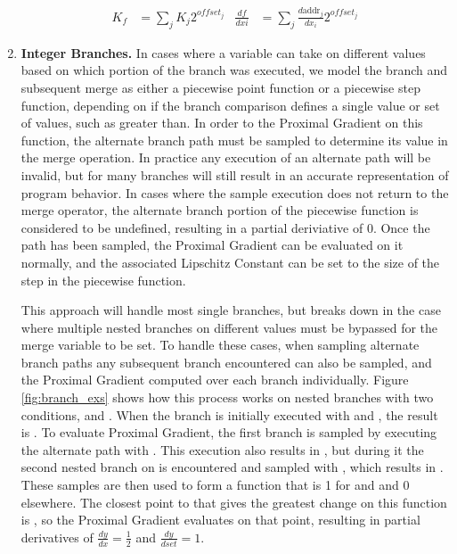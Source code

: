 \begin{enumerate}
\vspace{-10pt}\begin{align*}
  K_f &= \sum_j K_j 2^{offset_j} &
  \frac{df}{dxi} &= \sum_j \frac{d \textrm{addr}_j}{dx_i}2^{offset_j}
\end{align*}


\item \textbf{Integer Branches.} In cases where a variable can take on different values based on which portion of the branch was executed, we model the branch and subsequent merge as either a piecewise point function or a piecewise step function, depending on if the branch comparison defines a single value or set of values, such as greater than. In order to the Proximal Gradient on this function, the alternate branch path must be sampled to determine its value in the merge operation. In practice any execution of an alternate path will be invalid, but for many branches will still result in an accurate representation of program behavior. In cases where the sample execution does not return to the merge operator, the alternate branch portion of the piecewise function is considered to be undefined, resulting in a partial deriviative of 0. Once the path has been sampled, the Proximal Gradient can be evaluated on it normally, and the associated Lipschitz Constant can be set to the size of the step in the piecewise function.

  This approach will handle most single branches, but breaks down in the case where multiple nested branches on different values must be bypassed for the merge variable to be set. To handle these cases, when sampling alternate branch paths any subsequent branch encountered can also be sampled, and the Proximal Gradient computed over each branch individually. Figure \ref{fig:branch_exs} shows how this process works on nested branches with two conditions,  and . When the branch is initially executed with  and , the result is . To evaluate Proximal Gradient, the first branch is sampled by executing the alternate path with . This execution also results in , but during it the second nested branch on  is encountered and sampled with , which results in . These samples are then used to form a function that is 1 for  and  and 0 elsewhere. The closest point to  that gives the greatest change on this function is , so the Proximal Gradient evaluates on that point, resulting in partial derivatives of $\tfrac{dy}{dx}=\tfrac{1}{2}$ and $\tfrac{dy}{dset} = 1$.


\end{enumerate}
